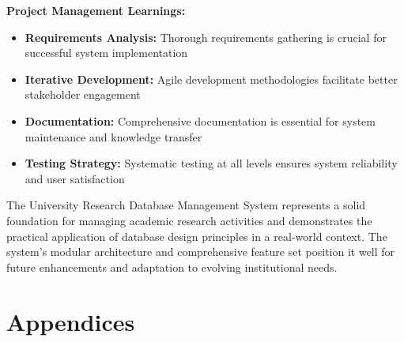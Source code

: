 \documentclass[12pt,a4paper]{article}
\begin{document}
\textbf{Project Management Learnings:}
\begin{itemize}
    \item \textbf{Requirements Analysis:} Thorough requirements gathering is crucial for successful system implementation
    \item \textbf{Iterative Development:} Agile development methodologies facilitate better stakeholder engagement
    \item \textbf{Documentation:} Comprehensive documentation is essential for system maintenance and knowledge transfer
    \item \textbf{Testing Strategy:} Systematic testing at all levels ensures system reliability and user satisfaction
\end{itemize}

The University Research Database Management System represents a solid foundation for managing academic research activities and demonstrates the practical application of database design principles in a real-world context. The system's modular architecture and comprehensive feature set position it well for future enhancements and adaptation to evolving institutional needs.

\section{Appendices}
\end{document}
